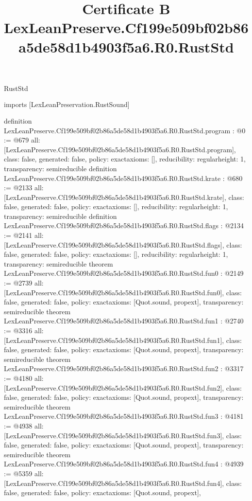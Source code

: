 \begin{lexlean}{RustStd}
\title{Certificate B LexLeanPreserve.Cf199e509bf02b86a5de58d1b4903f5a6.R0.RustStd}
\begin{coremodule}
imports [LexLeanPreservation.RustSound]

definition LexLeanPreserve.Cf199e509bf02b86a5de58d1b4903f5a6.R0.RustStd.program : @0 := @679 {
  all: [LexLeanPreserve.Cf199e509bf02b86a5de58d1b4903f5a6.R0.RustStd.program],
  class: false,
  generated: false,
  policy: exact{axioms: []},
  reducibility: regular{height: 1},
  transparency: semireducible
}
definition LexLeanPreserve.Cf199e509bf02b86a5de58d1b4903f5a6.R0.RustStd.krate : @680 := @2133 {
  all: [LexLeanPreserve.Cf199e509bf02b86a5de58d1b4903f5a6.R0.RustStd.krate],
  class: false,
  generated: false,
  policy: exact{axioms: []},
  reducibility: regular{height: 1},
  transparency: semireducible
}
definition LexLeanPreserve.Cf199e509bf02b86a5de58d1b4903f5a6.R0.RustStd.flags : @2134 := @2141 {
  all: [LexLeanPreserve.Cf199e509bf02b86a5de58d1b4903f5a6.R0.RustStd.flags],
  class: false,
  generated: false,
  policy: exact{axioms: []},
  reducibility: regular{height: 1},
  transparency: semireducible
}
theorem LexLeanPreserve.Cf199e509bf02b86a5de58d1b4903f5a6.R0.RustStd.fun0 : @2149 := @2739 {
  all: [LexLeanPreserve.Cf199e509bf02b86a5de58d1b4903f5a6.R0.RustStd.fun0],
  class: false,
  generated: false,
  policy: exact{axioms: [Quot.sound, propext]},
  transparency: semireducible
}
theorem LexLeanPreserve.Cf199e509bf02b86a5de58d1b4903f5a6.R0.RustStd.fun1 : @2740 := @3316 {
  all: [LexLeanPreserve.Cf199e509bf02b86a5de58d1b4903f5a6.R0.RustStd.fun1],
  class: false,
  generated: false,
  policy: exact{axioms: [Quot.sound, propext]},
  transparency: semireducible
}
theorem LexLeanPreserve.Cf199e509bf02b86a5de58d1b4903f5a6.R0.RustStd.fun2 : @3317 := @4180 {
  all: [LexLeanPreserve.Cf199e509bf02b86a5de58d1b4903f5a6.R0.RustStd.fun2],
  class: false,
  generated: false,
  policy: exact{axioms: [Quot.sound, propext]},
  transparency: semireducible
}
theorem LexLeanPreserve.Cf199e509bf02b86a5de58d1b4903f5a6.R0.RustStd.fun3 : @4181 := @4938 {
  all: [LexLeanPreserve.Cf199e509bf02b86a5de58d1b4903f5a6.R0.RustStd.fun3],
  class: false,
  generated: false,
  policy: exact{axioms: [Quot.sound, propext]},
  transparency: semireducible
}
theorem LexLeanPreserve.Cf199e509bf02b86a5de58d1b4903f5a6.R0.RustStd.fun4 : @4939 := @5359 {
  all: [LexLeanPreserve.Cf199e509bf02b86a5de58d1b4903f5a6.R0.RustStd.fun4],
  class: false,
  generated: false,
  policy: exact{axioms: [Quot.sound, propext]},
}
\end{coremodule}
\end{lexlean}
